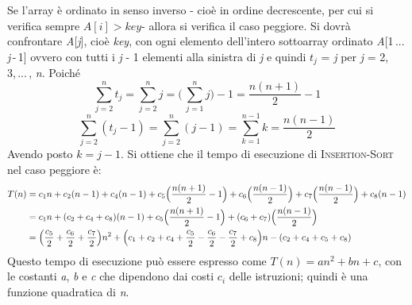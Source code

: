 \documentclass[10pt, a4paper]{report}
\begin{document}
Se l'array è ordinato in senso inverso - cioè in ordine decrescente, per cui si verifica sempre $A[\textit{i}] > \textit{key}$\;- allora si verifica il caso peggiore. Si dovrà confrontare \textit{A}[\textit{j}], cioè \textit{key}, con ogni elemento dell'intero sottoarray ordinato \textit{A}[1\,...\,\textit{j}\,-\,1] ovvero con tutti i \textit{j} - 1 elementi alla sinistra di \textit{j} e quindi $t_j$ = \textit{j} per \textit{j} = 2,\,3,\,...\,, \textit{n}. Poiché
\begin{equation*}
\sum_{j=2}^{n} t_j = \sum_{j=2}^{n} j = \Biggl(\,\sum_{j=1}^{n} j\Biggr) - 1 =  \frac{n(n+1)}{2} - 1
\end{equation*}
\begin{equation*}
\sum_{j=2}^{n} (t_j-1) = \sum_{j=2}^{n} (j-1) = \sum_{k=1}^{n-1}k =  \frac{n(n-1)}{2}
\end{equation*}
Avendo posto $k = j - 1$. Si ottiene che il tempo di esecuzione di \textsc{Insertion-Sort}  nel caso peggiore è:
\begin{equation*}
\begin{aligned}
T(n) &= c_1n + c_2(n-1) + c_4(n-1) + c_5\Bigr(\frac{n(n+1)}{2}-1\Bigr) + c_6\Bigl(\frac{n(n-1)}{2}\Bigr) + c_7\Bigl(\frac{n(n-1)}{2}\Bigr) + c_8(n-1) \\
&= c_1n + (c_2 + c_4 + c_8)(n-1) + c_5\Bigl(\frac{n(n+1)}{2}-1\Bigr) + (c_6 + c_7)\Bigl(\frac{n(n-1)}{2}\Bigr) \\
&= \Bigl(\frac{c_5}{2} + \frac{c_6}{2} + \frac{c_7}{2}\Bigr)n^2 + \Bigl(c_1 + c_2 + c_4 + \frac{c_5}{2} - \frac{c_6}{2} - \frac{c_7}{2} + c_8\Bigr)n - (c_2 + c_4 + c_5 + c_8)
\end{aligned}
\end{equation*}
Questo tempo di esecuzione può essere espresso come $T(n) = an^2 + bn + c$, con le costanti \textit{a}, \textit{b} e \textit{c} che dipendono dai costi $c_i$ delle istruzioni; quindi è una funzione quadratica di \textit{n}.
\end{document}
